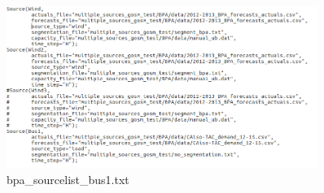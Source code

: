 \begin{figure}[H]
	\centering
	\begin{framed}
		\includegraphics[width=0.9\textwidth]{bpa_sourcelist_bus1.png}
	\end{framed}
	\caption{bpa\_sourcelist\_bus1.txt}
\end{figure}




